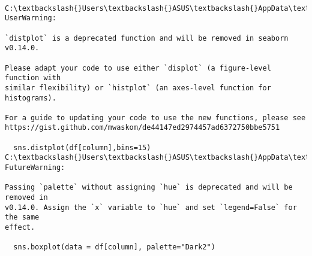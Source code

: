 \documentclass[11pt]{article}
\begin{document}
    \begin{center}
    \end{center}
    { \hspace*{\fill} \\}
    
    \begin{Verbatim}[commandchars=\\\{\}]
C:\textbackslash{}Users\textbackslash{}ASUS\textbackslash{}AppData\textbackslash{}Local\textbackslash{}Temp\textbackslash{}ipykernel\_1856\textbackslash{}3792330012.py:5: UserWarning:

`distplot` is a deprecated function and will be removed in seaborn v0.14.0.

Please adapt your code to use either `displot` (a figure-level function with
similar flexibility) or `histplot` (an axes-level function for histograms).

For a guide to updating your code to use the new functions, please see
https://gist.github.com/mwaskom/de44147ed2974457ad6372750bbe5751

  sns.distplot(df[column],bins=15)
C:\textbackslash{}Users\textbackslash{}ASUS\textbackslash{}AppData\textbackslash{}Local\textbackslash{}Temp\textbackslash{}ipykernel\_1856\textbackslash{}3792330012.py:8: FutureWarning:

Passing `palette` without assigning `hue` is deprecated and will be removed in
v0.14.0. Assign the `x` variable to `hue` and set `legend=False` for the same
effect.

  sns.boxplot(data = df[column], palette="Dark2")
    \end{Verbatim}

    \begin{center}
    \end{center}
    { \hspace*{\fill} \\}
    
\end{document}
